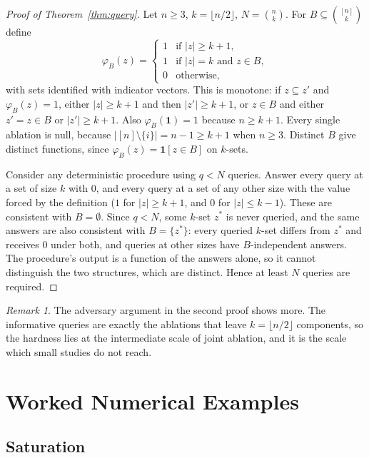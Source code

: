 \documentclass[11pt]{article}
\theoremstyle{definition}
\theoremstyle{remark}
\newtheorem{remark}[theorem]{Remark}
\newcommand{\ind}{\mathbf{1}}
\begin{document}
\begin{proof}[Proof of Theorem~\ref{thm:query}]
Let $n\ge 3$, $k=\lfloor n/2\rfloor$, $N=\binom nk$. For $B\subseteq\binom{[n]}{k}$ define
\[
\varphi_B(z)=\begin{cases}1&\text{if }|z|\ge k+1,\\ 1&\text{if }|z|=k\text{ and }z\in B,\\ 0&\text{otherwise,}\end{cases}
\]
with sets identified with indicator vectors. This is monotone: if $z\subseteq z'$ and $\varphi_B(z)=1$, either $|z|\ge k+1$ and then $|z'|\ge k+1$, or $z\in B$ and either $z'=z\in B$ or $|z'|\ge k+1$. Also $\varphi_B(\mathbf 1)=1$ because $n\ge k+1$. Every single ablation is null, because $|[n]\setminus\{i\}|=n-1\ge k+1$ when $n\ge 3$. Distinct $B$ give distinct functions, since $\varphi_B(z)=\ind[z\in B]$ on $k$-sets.

Consider any deterministic procedure using $q<N$ queries. Answer every query at a set of size $k$ with $0$, and every query at a set of any other size with the value forced by the definition ($1$ for $|z|\ge k+1$, and $0$ for $|z|\le k-1$). These are consistent with $B=\emptyset$. Since $q<N$, some $k$-set $z^*$ is never queried, and the same answers are also consistent with $B=\{z^*\}$: every queried $k$-set differs from $z^*$ and receives $0$ under both, and queries at other sizes have $B$-independent answers. The procedure's output is a function of the answers alone, so it cannot distinguish the two structures, which are distinct. Hence at least $N$ queries are required.
\end{proof}

\begin{remark}
The adversary argument in the second proof shows more. The informative queries are exactly the ablations that leave $k=\lfloor n/2\rfloor$ components, so the hardness lies at the intermediate scale of joint ablation, and it is the scale which small studies do not reach.
\end{remark}

\section{Worked Numerical Examples}\label{app:examples}

\subsection{Saturation}
\end{document}
